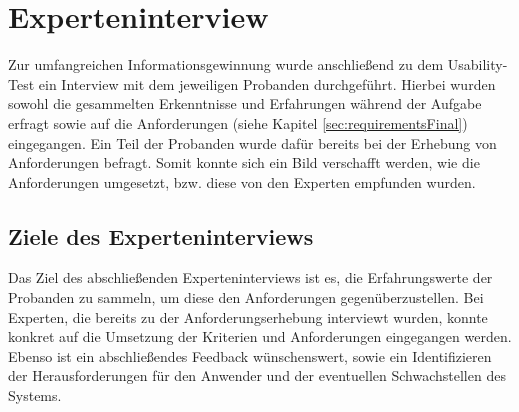 \section{Experteninterview}
        Zur umfangreichen Informationsgewinnung wurde anschließend zu dem Usability-Test ein Interview mit dem jeweiligen Probanden 
        durchgeführt. Hierbei wurden sowohl die gesammelten Erkenntnisse und Erfahrungen während der Aufgabe erfragt sowie auf die Anforderungen 
        (siehe Kapitel \ref{sec:requirementsFinal}) eingegangen. Ein Teil der Probanden wurde dafür bereits 
        bei der Erhebung von Anforderungen befragt. Somit konnte sich ein Bild verschafft werden, wie die Anforderungen 
        umgesetzt, bzw. diese von den Experten empfunden wurden.
    
    \subsection{Ziele des Experteninterviews}
        Das Ziel des abschließenden Experteninterviews ist es, die Erfahrungswerte der Probanden zu sammeln, um diese den Anforderungen gegenüberzustellen. Bei 
        Experten, die bereits zu der Anforderungserhebung interviewt wurden, konnte konkret auf die Umsetzung der Kriterien und Anforderungen eingegangen werden. 
        Ebenso ist ein abschließendes Feedback wünschenswert, sowie ein Identifizieren der Herausforderungen für den Anwender und der eventuellen Schwachstellen 
        des Systems. 

